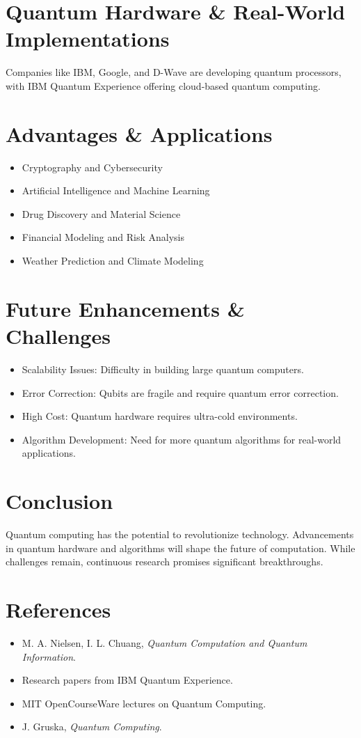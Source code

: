 \documentclass[a4paper,12pt]{article}
\begin{document}
\section{Quantum Hardware \& Real-World Implementations}
Companies like IBM, Google, and D-Wave are developing quantum processors, with IBM Quantum Experience offering cloud-based quantum computing.

\section{Advantages \& Applications}
\begin{itemize}
    \item Cryptography and Cybersecurity
    \item Artificial Intelligence and Machine Learning
    \item Drug Discovery and Material Science
    \item Financial Modeling and Risk Analysis
    \item Weather Prediction and Climate Modeling
\end{itemize}

\section{Future Enhancements \& Challenges}
\begin{itemize}
    \item Scalability Issues: Difficulty in building large quantum computers.
    \item Error Correction: Qubits are fragile and require quantum error correction.
    \item High Cost: Quantum hardware requires ultra-cold environments.
    \item Algorithm Development: Need for more quantum algorithms for real-world applications.
\end{itemize}

\section{Conclusion}
Quantum computing has the potential to revolutionize technology. Advancements in quantum hardware and algorithms will shape the future of computation. While challenges remain, continuous research promises significant breakthroughs.

\section{References}
\begin{itemize}
    \item M. A. Nielsen, I. L. Chuang, \textit{Quantum Computation and Quantum Information}.
    \item Research papers from IBM Quantum Experience.
    \item MIT OpenCourseWare lectures on Quantum Computing.
    \item J. Gruska, \textit{Quantum Computing}.
\end{itemize}
\end{document}
